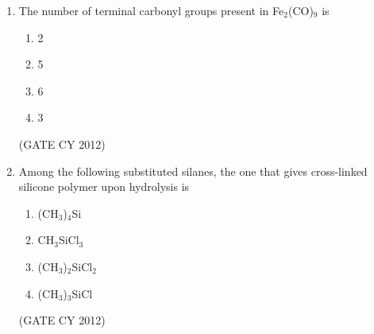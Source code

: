 \documentclass[12pt]{article}
\begin{document}
\begin{enumerate}
\item The number of terminal carbonyl groups present in Fe$_2$(CO)$_9$ is
\begin{multicols}{2}
\begin{enumerate}
    \item 2
    \item 5
    \item 6
    \item 3
\end{enumerate}
\end{multicols}
\hfill (GATE CY 2012)

\item Among the following substituted silanes, the one that gives cross-linked silicone polymer upon hydrolysis is
\begin{multicols}{2}
\begin{enumerate}
    \item (CH$_3$)$_4$Si
    \item CH$_3$SiCl$_3$
    \item (CH$_3$)$_2$SiCl$_2$
    \item (CH$_3$)$_3$SiCl
\end{enumerate}
\end{multicols}
\hfill (GATE CY 2012)


\end{enumerate}
\end{document}
